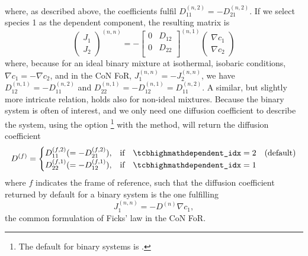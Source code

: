 where, as described above, the coefficients fulfil $D_{11}^{(n, 2)} = - D_{21}^{(n, 2)}$. If we select species 1 as the dependent component, the resulting matrix is
\begin{equation}
    \begin{pmatrix}J_1 \\ J_2\end{pmatrix}^{(n, n)} = -
    \begin{bmatrix}
    0 & D_{12} \\
    0 & D_{22} \\
    \end{bmatrix}^{(n, 1)}
    \begin{pmatrix}\nabla c_1 \\ \nabla c_2\end{pmatrix}
\end{equation}
where, because for an ideal binary mixture at isothermal, isobaric conditions, $\nabla c_1 = - \nabla c_2$, and in the CoN FoR, $J_1^{(n, n)} = - J_2^{(n, n)}$, we have $D_{12}^{(n, 1)} = - D_{11}^{(n, 2)}$ and $D_{22}^{(n, 1)} = - D_{12}^{(n, 1)} = D_{11}^{(n, 2)}$. A similar, but slightly more intricate relation, holds also for non-ideal mixtures.\cite{retmie} Because the binary system is often of interest, and we only need one diffusion coefficient to describe the system, using the option \footnote{The default for binary systems is .} with the  method, will return the diffusion coefficient
\begin{equation}
    D^{(f)} = 
    \begin{cases}
        D_{11}^{(f, 2)} (= - D_{21}^{(f, 2)}), & \text{if} \quad \code{\text{dependent\_idx}} = 2 \quad \text{(default)}\\
        D_{22}^{(f, 1)} (= - D_{12}^{(f, 1)}), & \text{if} \quad \code{\text{dependent\_idx}} = 1 
    \end{cases}
\end{equation}
where $f$ indicates the frame of reference, such that the diffusion coefficient returned by default for a binary system is the one fulfilling
\begin{equation}
    J_1^{(n, n)} = - D^{(n)} \nabla c_1,
\end{equation}
the common formulation of Ficks' law in the CoN FoR.

